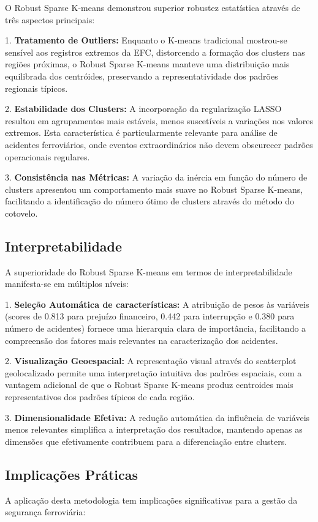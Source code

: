 \documentclass[conference]{IEEEtran}
\begin{document}
O Robust Sparse K-means demonstrou superior robustez estatística através de três aspectos principais:

1. \textbf{Tratamento de Outliers:} Enquanto o K-means tradicional mostrou-se sensível aos registros extremos da EFC, distorcendo a formação dos clusters nas regiões próximas, o Robust Sparse K-means manteve uma distribuição mais equilibrada dos centróides, preservando a representatividade dos padrões regionais típicos.

2. \textbf{Estabilidade dos Clusters:} A incorporação da regularização LASSO resultou em agrupamentos mais estáveis, menos suscetíveis a variações nos valores extremos. Esta característica é particularmente relevante para análise de acidentes ferroviários, onde eventos extraordinários não devem obscurecer padrões operacionais regulares.

3. \textbf{Consistência nas Métricas:} A variação da inércia em função do número de clusters apresentou um comportamento mais suave no Robust Sparse K-means, facilitando a identificação do número ótimo de clusters através do método do cotovelo.

\subsection{Interpretabilidade}
A superioridade do Robust Sparse K-means em termos de interpretabilidade manifesta-se em múltiplos níveis:

1. \textbf{Seleção Automática de características:} A atribuição de pesos às variáveis (scores de 0.813 para prejuízo financeiro, 0.442 para interrupção e 0.380 para número de acidentes) fornece uma hierarquia clara de importância, facilitando a compreensão dos fatores mais relevantes na caracterização dos acidentes.

2. \textbf{Visualização Geoespacial:} A representação visual através do scatterplot geolocalizado permite uma interpretação intuitiva dos padrões espaciais, com a vantagem adicional de que o Robust Sparse K-means produz centroides mais representativos dos padrões típicos de cada região.

3. \textbf{Dimensionalidade Efetiva:} A redução automática da influência de variáveis menos relevantes simplifica a interpretação dos resultados, mantendo apenas as dimensões que efetivamente contribuem para a diferenciação entre clusters.

\subsection{Implicações Práticas}
A aplicação desta metodologia tem implicações significativas para a gestão da segurança ferroviária:
\end{document}
